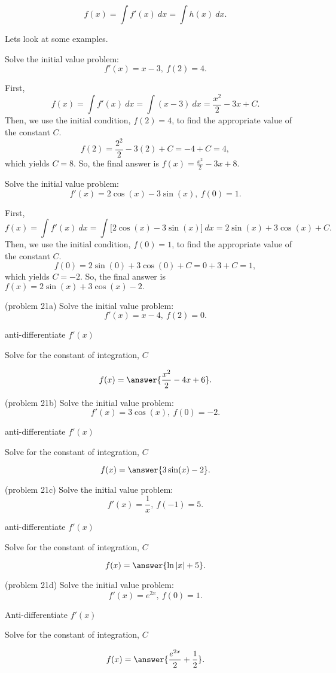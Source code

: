 \documentclass[handout]{ximera}
\begin{document}
\[f(x) = \int f'(x) \ dx = \int h(x) \ dx.\]

Lets look at some examples.

\begin{example}[example 20]
Solve the initial value problem:
\[f'(x) = x - 3, \ f(2) = 4.\]

First, 
\[f(x) = \int f'(x) \ dx = \int (x-3)  \ dx = \frac{x^2}{2} - 3x + C.\]
Then, we use the initial condition, $f(2) = 4$, to find the 
appropriate value of the constant $C$.
\[f(2) = \frac{2^2}{2} - 3(2) + C = -4 + C = 4,\]
which yields $C = 8$.
So, the final answer is  $f(x) = \frac{x^2}{2} -3x + 8.$
\end{example}

\begin{example}[example 21]
Solve the initial value problem:
\[f'(x) = 2\cos(x) -3\sin(x), \ f(0) = 1.\]

First, 
\[f(x) = \int f'(x) \ dx = \int \big[2\cos(x) -3\sin(x)\big]  \ dx =
 2\sin(x) + 3\cos(x) + C.\]
Then, we use the initial condition, $f(0) = 1$, to find the 
appropriate value of the constant $C$.
\[f(0) = 2\sin(0) + 3\cos(0) + C = 0 + 3 + C = 1,\]
which yields $C = -2$.
So, the final answer is  $f(x) = 2\sin(x) + 3\cos(x)-2.$
\end{example}

\begin{problem}(problem 21a)
Solve the initial value problem:
\[f'(x) = x-4, \ f(2) = 0.\]
\begin{hint}
anti-differentiate $f'(x)$
\end{hint}
\begin{hint}
Solve for the constant of integration, $C$
\end{hint}
\[f(x) = \answer{\frac{x^2}{2} - 4x + 6}.\]
\end{problem}

\begin{problem}(problem 21b)
Solve the initial value problem:
\[f'(x) = 3\cos(x), \ f(0) = -2.\]
\begin{hint}
anti-differentiate $f'(x)$
\end{hint}
\begin{hint}
Solve for the constant of integration, $C$
\end{hint}
\[f(x) = \answer{3\sin(x) - 2}.\]
\end{problem}

\begin{problem}(problem 21c)
Solve the initial value problem:
\[f'(x) = \frac{1}{x}, \ f(-1) = 5.\]
\begin{hint}
anti-differentiate $f'(x)$
\end{hint}
\begin{hint}
Solve for the constant of integration, $C$
\end{hint}
\[f(x) = \answer{\ln|x| + 5}.\]
\end{problem}

\begin{problem}(problem 21d)
Solve the initial value problem:
\[f'(x) = e^{2x}, \ f(0) = 1.\]
\begin{hint}
Anti-differentiate $f'(x)$
\end{hint}
\begin{hint}
Solve for the constant of integration, $C$
\end{hint}
\[f(x) = \answer{\frac{e^{2x}}{2} + \frac12}.\]
\end{problem}
\end{document}

